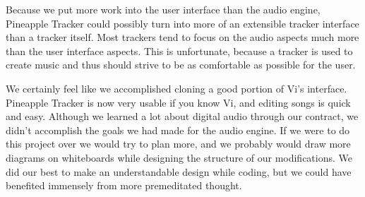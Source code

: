 \documentclass[12pt,letterpaper]{article}
\begin{document}
\par
Because we put more work into the user interface than the audio engine, Pineapple Tracker could possibly turn into more of an extensible tracker interface than a tracker itself.
Most trackers tend to focus on the audio aspects much more than the user interface aspects.
This is unfortunate, because a tracker is used to create music and thus should strive to be as comfortable as possible for the user.

\par
We certainly feel like we accomplished cloning a good portion of Vi's interface.
Pineapple Tracker is now very usable if you know Vi, and editing songs is quick and easy.
Although we learned a lot about digital audio through our contract, we didn't accomplish the goals we had made for the audio engine.
If we were to do this project over we would try to plan more, and we probably would draw more diagrams on whiteboards while designing the structure of our modifications.
We did our best to make an understandable design while coding, but we could have benefited immensely from more premeditated thought.
\end{document}
